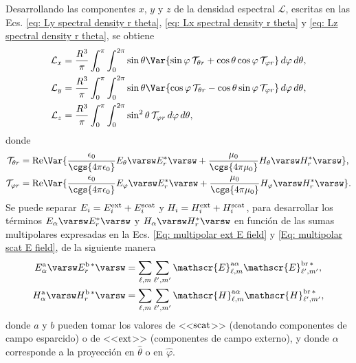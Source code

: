 Desarrollando las componentes $x$, $y$ y $z$ de la densidad espectral $\mathcal{L}$, escritas en las Ecs. \eqref{eq: Ly spectral density r theta}, \eqref{eq: Lx spectral density r theta} y \eqref{eq: Lz spectral density r theta}, se obtiene
%
\begin{align}
\mathcal{L}_x &= \frac{R^3}{\pi}\int_0^{\pi}\int_0^{2\pi} \sin\theta \Var{\sin\varphi \,\mathcal{T}_{\theta r} + \cos\theta\cos\varphi\,\mathcal{T}_{\varphi r}} \,d\varphi \, d\theta, \label{eq: Lx spectral integral angles}\\
\mathcal{L}_y &= \frac{R^3}{\pi}\int_0^{\pi}\int_0^{2\pi} \sin\theta \Var{\cos\varphi \,\mathcal{T}_{\theta r} - \cos\theta\sin\varphi\,\mathcal{T}_{\varphi r}} \,d\varphi \, d\theta, \label{eq: Ly spectral integral angles}\\
\mathcal{L}_z &= \frac{R^3}{\pi}\int_0^{\pi}\int_0^{2\pi} \sin^{2}\theta \, \mathcal{T}_{\varphi r} \,d\varphi \, d\theta, \label{eq: Lz spectral integral angles}
\end{align}
% 
donde 
\begin{align}
\mathcal{T}_{\theta r} &= {\rm Re}\Var{\frac{\epsilon_0}{\cgs{4\pi\epsilon_0}} E_{\theta}\varsw E_{r}^{*}\varsw + \frac{\mu_0}{\cgs{4\pi\mu_0}} H_{\theta}\varsw H_{r}^{*}\varsw  },\label{Eq: T theta r}\\
\mathcal{T}_{\varphi r} &= {\rm Re}\Var{\frac{\epsilon_0}{\cgs{4\pi\epsilon_0}} E_{\varphi}\varsw E_{r}^{*}\varsw + \frac{\mu_0}{\cgs{4\pi\mu_0}} H_{\varphi}\varsw H_{r}^{*}\varsw  }. \label{Eq: T phi r}
\end{align}
%
Se puede separar $E_i=E_i^{\rm ext}+E_i^{\rm scat}$ y $H_i=H_i^{\rm ext}+H_i^{\rm scat}$, para desarrollar los términos $E_{\alpha}\varsw E_{r}^{*}\varsw$ y $H_{\alpha}\varsw H_{r}^{*}\varsw$ en función de las sumas multipolares expresadas en la Ecs. \eqref{Eq: multipolar ext E field} y \eqref{Eq: multipolar scat E field}, de la siguiente manera
\begin{align}
E^{\rm a}_{\alpha}\varsw E_{r}^{\rm b \,*}\varsw &= \sum_{\ell, m} \sum_{\ell^{\prime}, m^{\prime}} \mathscr{E}_{\ell, m}^{\text{a}\alpha}\mathscr{E}_{\ell^{\prime}, m^{\prime}}^{\text{br}\,*},\label{eq: cross terms E field}\\
H^{\rm a}_{\alpha}\varsw H_{r}^{\rm b \,*}\varsw &= \sum_{\ell, m} \sum_{\ell^{\prime}, m^{\prime}} \mathscr{H}_{\ell, m}^{\text{a}\alpha}\mathscr{H}_{\ell^{\prime}, m^{\prime}}^{\text{br}\,*},\label{eq: cross terms H field}
\end{align}
donde $a$ y $b$ pueden tomar los valores de <<$\rm scat$>> (denotando componentes de campo esparcido) o de <<$\rm ext$>> (componentes de campo externo), y donde $\alpha$ corresponde a la proyección en $\hat{ \theta}$ o en $\hat{\varphi}$. 

